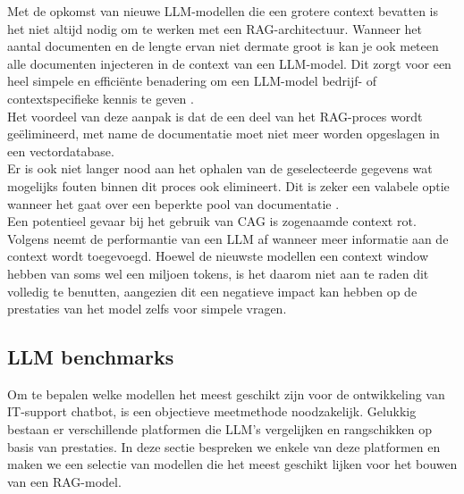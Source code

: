 Met de opkomst van nieuwe LLM-modellen die een grotere context bevatten is het niet altijd nodig om te werken met een RAG-architectuur. Wanneer het aantal documenten en de lengte ervan niet dermate groot is kan je ook meteen alle documenten injecteren in de context van een LLM-model. Dit zorgt voor een heel simpele en efficiënte benadering om een LLM-model bedrijf- of contextspecifieke kennis te geven \autocite{Chan2025}.
\\[1em]
Het voordeel van deze aanpak is dat de een deel van het RAG-proces wordt geëlimineerd, met name de documentatie moet niet meer worden opgeslagen in een vectordatabase. 
\\[1em]
Er is ook niet langer nood aan het ophalen van de geselecteerde gegevens wat mogelijks fouten binnen dit proces ook elimineert. Dit is zeker een valabele optie wanneer het gaat over een beperkte pool van documentatie \autocite{Chan2025}. 
\\[1em]
Een potentieel gevaar bij het gebruik van CAG is zogenaamde context rot. Volgens \textcite{hong2025context} neemt de performantie van een LLM af wanneer meer informatie aan de context wordt toegevoegd. Hoewel de nieuwste modellen een context window hebben van soms wel een miljoen tokens, is het daarom niet aan te raden dit volledig te benutten, aangezien dit een negatieve impact kan hebben op de prestaties van het model zelfs voor simpele vragen.

\subsection{LLM benchmarks}
Om te bepalen welke modellen het meest geschikt zijn voor de ontwikkeling van IT-support chatbot, is een objectieve meetmethode noodzakelijk. Gelukkig bestaan er verschillende platformen die LLM's vergelijken en rangschikken op basis van prestaties. In deze sectie bespreken we enkele van deze platformen en maken we een selectie van modellen die het meest geschikt lijken voor het bouwen van een RAG-model.
   
